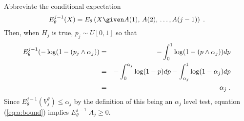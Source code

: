 \documentclass[12pt]{article}
\begin{document}
Abbreviate the conditional expectation
\begin{displaymath}
  E_\theta^{j-1}(X) 
     = E_\theta \left(X \given  A(1),\,A(2),\,\ldots,A(j-1) \right)\;.
\end{displaymath}
Then, when $H_j$ is true, $p_j \sim U[0,1]$ so that
\begin{eqnarray*}
  E_\theta^{j-1}(-\log(1 - (p_j \wedge \alpha_j)) 
   &=&  -\int_0^1 \log(1 - (p \wedge \alpha_j)) dp \cr
   &=&  -\int_0^{\alpha_j} \log(1 - p) dp - \int_{\alpha_j}^1 \log(1 - \alpha_j) dp \\
   &=&  \alpha_j  \;.
\end{eqnarray*}
Since $E_\theta^{j-1}(V^\theta_j) \le \alpha_j$ by the definition of
this being an $\alpha_j$ level test, equation (\ref{eq:a:bound})
implies $E_\theta^{j-1} \; A_j \ge 0$.

\hfill \QED




\end{document}

